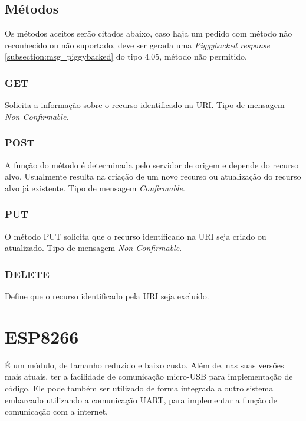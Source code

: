 \subsection{Métodos}

Os métodos aceitos serão citados abaixo, caso haja um pedido com método não reconhecido ou não suportado, deve ser gerada uma \textit{Piggybacked response} \ref{subsection:msg_piggybacked} do tipo 4.05, método não permitido.

\subsubsection {GET}

Solicita a informação sobre o recurso identificado na URI.  Tipo de mensagem \textit{Non-Confirmable}.

\subsubsection {POST}
\label{subsubsection:post}
A função do método é determinada pelo servidor de origem e depende do recurso alvo. Usualmente resulta na criação de um novo recurso ou atualização do recurso alvo já existente. Tipo de mensagem \textit{Confirmable}.

\subsubsection {PUT}

O método PUT solicita que o recurso identificado na URI seja criado ou atualizado. Tipo de mensagem \textit{Non-Confirmable}.

\subsubsection {DELETE}

Define que o recurso identificado pela URI seja excluído.

\section{ESP8266}

É um módulo, de tamanho reduzido e baixo custo. Além de, nas suas versões mais atuais, ter a facilidade de comunicação micro-USB para implementação de código. Ele pode também ser utilizado de forma integrada a outro sistema embarcado utilizando a comunicação UART, para implementar a função de comunicação com a internet.



